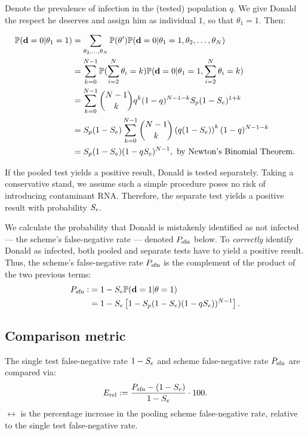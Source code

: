 \documentclass{article}
\begin{document}
Denote the prevalence of infection in the (tested) population $q$. We
give Donald the respect he deserves and assign him as individual $1$,
so that $\theta_1=1$. Then:

\begin{align}
  \begin{split}
    \mathbb{P}(\mathbf{d}=0|\theta_1=1) &= \sum_{\theta_2,\dots,\theta_N} \mathbb{P}(\theta') \mathbb{P}(\mathbf{d}=0|\theta_1=1,\theta_2,\dots,\theta_N) \\
    &= \sum_{k=0}^{N-1}\mathbb{P}(\sum_{i=2}^N\theta_i=k)\mathbb{P}(\mathbf{d}=0|\theta_1=1,\sum_{i=2}^N\theta_i = k)\\
    &= \sum_{k=0}^{N-1}\binom{N-1}{k}q^k(1-q)^{N-1-k} S_p(1-S_e)^{1+k}\\
    &= S_p(1-S_e) \sum_{k=0}^{N-1}\binom{N-1}{k}\left(q(1-S_e)\right)^k(1-q)^{N-1-k}\\
    &= S_p(1-S_e)(1-qS_e)^{N-1}, \text{ by Newton's Binomial Theorem.} \\
  \end{split}
\end{align}

If the pooled test yields a positive result, Donald is tested
separately. Taking a conservative stand, we assume such a simple
procedure poses no risk of introducing contaminant RNA. Therefore, the
separate test yields a positive result with probability $S_e$.

We calculate the probability that Donald is mistakenly identified as
not infected --- the scheme's false-negative rate --- denoted $P_{\text{sfn}}$
below. To \emph{correctly} identify Donald as infected, both pooled
and separate tests have to yield a positive result. Thus, the scheme's
false-negative rate $P_{\text{sfn}}$ is the complement of the product of the two
previous terms:
\begin{align}\label{eq:sfn}
    \begin{split}
        P_{\text{sfn}} :&= 1 - S_e\mathbb{P}(\mathbf{d}=1|\theta=1)\\
        &= 1 - S_e\left [1 - S_p(1-S_e)(1-qS_e))^{N-1}\right].
    \end{split}
\end{align}

\subsection{Comparison metric}
The single test false-negative rate $1-S_e$ and scheme false-negative
rate $P_{\text{sfn}}$ are compared via:
\begin{equation}\label{eq:erel}
E_{\text{rel}} := \frac{P_{\text{sfn}} - (1-S_e)}{1-S_e} \cdot 100.
\end{equation}
$\rel$ is the percentage increase in the pooling scheme false-negative
rate, relative to the single test false-negative rate.
\end{document}
